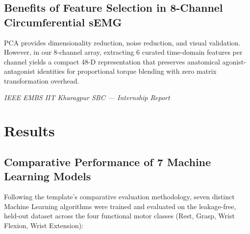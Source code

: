 \documentclass[12pt,a4paper]{article}
\begin{document}
\subsection{Benefits of Feature Selection in 8-Channel Circumferential sEMG}
PCA provides dimensionality reduction, noise reduction, and visual validation. However, in our 8-channel array, extracting 6 curated time-domain features per channel yields a compact 48-D representation that preserves anatomical agonist-antagonist identities for proportional torque blending with zero matrix transformation overhead.

\vfill
\begin{center}
    \footnotesize\textit{IEEE EMBS IIT Kharagpur SBC --- Internship Report}
\end{center}

\newpage
\section{Results}\label{sec:results}

\subsection{Comparative Performance of 7 Machine Learning Models}

Following the template's comparative evaluation methodology, seven distinct Machine Learning algorithms were trained and evaluated on the leakage-free, held-out dataset across the four functional motor classes (Rest, Grasp, Wrist Flexion, Wrist Extension):
\end{document}
